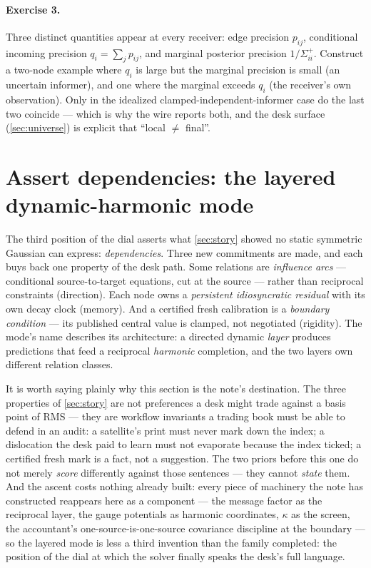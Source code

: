 \documentclass[11pt]{article}
\begin{document}
\paragraph{Exercise 3.}
Three distinct quantities appear at every receiver: edge precision
$p_{ij}$, conditional incoming precision $q_i=\sum_jp_{ij}$, and marginal
posterior precision $1/\Sigma^+_{ii}$.  Construct a two-node example where
$q_i$ is large but the marginal precision is small (an uncertain
informer), and one where the marginal exceeds $q_i$ (the receiver's own
observation).  Only in the idealized clamped-independent-informer case do
the last two coincide --- which is why the wire reports both, and the
desk surface (\cref{sec:universe}) is explicit that ``local $\neq$
final''.

\section{Assert dependencies: the layered dynamic-harmonic mode}
\label{sec:layered}

The third position of the dial asserts what \cref{sec:story} showed no
static symmetric Gaussian can express: \emph{dependencies}.  Three new
commitments are made, and each buys back one property of the desk path.
Some relations are \emph{influence arcs} --- conditional source-to-target
equations, cut at the source --- rather than reciprocal constraints
(direction).  Each node owns a \emph{persistent idiosyncratic residual}
with its own decay clock (memory).  And a certified fresh calibration is a
\emph{boundary condition} --- its published central value is clamped, not
negotiated (rigidity).  The mode's name describes its architecture: a
directed dynamic \emph{layer} produces predictions that feed a reciprocal
\emph{harmonic} completion, and the two layers own different relation
classes.

It is worth saying plainly why this section is the note's destination.
The three properties of \cref{sec:story} are not preferences a desk might
trade against a basis point of RMS --- they are workflow invariants a
trading book must be able to defend in an audit: a satellite's print must
never mark down the index; a dislocation the desk paid to learn must not
evaporate because the index ticked; a certified fresh mark is a fact, not
a suggestion.  The two priors before this one do not merely \emph{score}
differently against those sentences --- they cannot \emph{state} them.
And the ascent costs nothing already built: every piece of machinery the
note has constructed reappears here as a component --- the message factor
as the reciprocal layer, the gauge potentials as harmonic coordinates,
$\kappa$ as the screen, the accountant's one-source-is-one-source
covariance discipline at the boundary --- so the layered mode is less a
third invention than the family completed: the position of the dial at
which the solver finally speaks the desk's full language.
\end{document}
